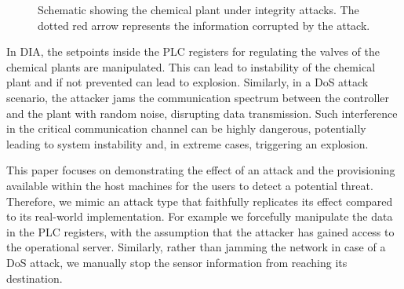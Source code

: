 \begin{figure}[!htbp]
    \caption{Schematic showing the chemical plant under integrity attacks. The dotted red arrow represents the information corrupted by the attack.}
    \label{fig:Chemical_attacks}
\end{figure}
In DIA, the setpoints inside the PLC registers for regulating the valves of the chemical plants are manipulated. This can lead to instability of the chemical plant and if not prevented can lead to explosion. 
Similarly, in a DoS attack scenario, the attacker jams the communication spectrum between the controller and the plant with random noise, disrupting data transmission. Such interference in the critical communication channel can be highly dangerous, potentially leading to system instability and, in extreme cases, triggering an explosion. 

This paper focuses on demonstrating the effect of an attack and the provisioning available within the host machines for the users to detect a potential threat. Therefore, we mimic an attack type that faithfully replicates its effect compared to its real-world implementation. For example we forcefully manipulate the data in the PLC registers, with the assumption that the attacker has gained access to the operational server. Similarly, rather than jamming the network in case of a DoS attack, we manually stop the sensor information from reaching its destination. 

